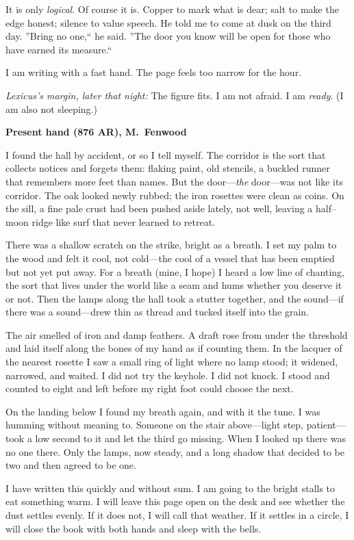 \documentclass[11pt]{article}
\numberwithin{equation}{section} %
\theoremstyle{plain} %
\theoremstyle{definition} %
\theoremstyle{remark} %
\begin{document}
It is only \emph{logical}. Of course it is. Copper to mark what is dear; salt to make the edge honest; silence to value speech. He told me to come at dusk on the third day. ''Bring no one,`` he said. ''The door you know will be open for those who have earned its measure.``

I am writing with a fast hand. The page feels too narrow for the hour.

\medskip
\noindent\textit{Lexicus's margin, later that night:} The figure fits. I am not afraid. I am \emph{ready}. (I am also not sleeping.)

\medskip
\noindent\textbf{Present hand (876 AR), M.\ Fenwood}

I found the hall by accident, or so I tell myself. The corridor is the sort that collects notices and forgets them: flaking paint, old stencils, a buckled runner that remembers more feet than names. But the door---\emph{the} door---was not like its corridor. The oak looked newly rubbed; the iron rosettes were clean as coins. On the sill, a fine pale crust had been pushed aside lately, not well, leaving a half--moon ridge like surf that never learned to retreat.

There was a shallow scratch on the strike, bright as a breath. I set my palm to the wood and felt it cool, not cold---the cool of a vessel that has been emptied but not yet put away. For a breath (mine, I hope) I heard a low line of chanting, the sort that lives under the world like a seam and hums whether you deserve it or not. Then the lamps along the hall took a stutter together, and the sound---if there was a sound---drew thin as thread and tucked itself into the grain.

The air smelled of iron and damp feathers. A draft rose from under the threshold and laid itself along the bones of my hand as if counting them. In the lacquer of the nearest rosette I saw a small ring of light where no lamp stood; it widened, narrowed, and waited. I did not try the keyhole. I did not knock. I stood and counted to eight and left before my right foot could choose the next.

On the landing below I found my breath again, and with it the tune. I was humming without meaning to. Someone on the stair above---light step, patient---took a low second to it and let the third go missing. When I looked up there was no one there. Only the lamps, now steady, and a long shadow that decided to be two and then agreed to be one.

I have written this quickly and without sum. I am going to the bright stalls to eat something warm. I will leave this page open on the desk and see whether the dust settles evenly. If it does not, I will call that weather. If it settles in a circle, I will close the book with both hands and sleep with the bells.
\end{document}
